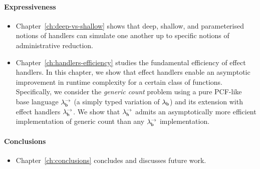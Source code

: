 \documentclass[12pt,phd,lfcs,twoside,openright,logo,leftchapter,normalheadings]{infthesis}
\theoremstyle{plain}
\theoremstyle{definition}
\begin{document}
\paragraph{Expressiveness}
\begin{itemize}
  \item Chapter~\ref{ch:deep-vs-shallow} shows that deep, shallow, and
parameterised notions of handlers can simulate one another up to
specific notions of administrative reduction.

  \item Chapter~\ref{ch:handlers-efficiency} studies the fundamental efficiency of effect
handlers. In this chapter, we show that effect handlers enable an
asymptotic improvement in runtime complexity for a certain class of
functions. Specifically, we consider the \emph{generic count} problem
using a pure PCF-like base language $\lambda^\rightarrow_{\mathsf{b}}$ (a simply typed variation
of $\lambda_{\mathsf{b}}$) and its extension with effect handlers $\lambda^\rightarrow_{\mathsf{h}}$.
%
We show that $\lambda^\rightarrow_{\mathsf{h}}$ admits an asymptotically more efficient
implementation of generic count than any $\lambda^\rightarrow_{\mathsf{b}}$ implementation.
%
\end{itemize}

\paragraph{Conclusions}
\begin{itemize}
  \item Chapter~\ref{ch:conclusions} concludes and discusses future work.
\end{itemize}
\end{document}
